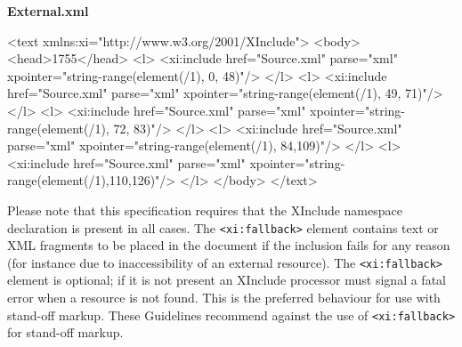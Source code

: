 \par\egroup 
 \mbox{}\newline 
  \textbf{External.xml} \par\hfill\bgroup\exampleFont\vskip 10pt\begin{shaded}
\obeyspaces <text xmlns:xi="http://www.w3.org/2001/XInclude">\newline
 <body>\newline
  <head>1755</head>\newline
   <l>\newline
    <xi:include href="Source.xml" parse="xml"\newline
 xpointer="string-range(element(/1),  0, 48)"/>\newline
   </l>\newline
   <l>\newline
    <xi:include href="Source.xml" parse="xml"\newline
 xpointer="string-range(element(/1), 49, 71)"/>\newline
   </l>\newline
   <l>\newline
    <xi:include href="Source.xml" parse="xml"\newline
 xpointer="string-range(element(/1), 72, 83)"/>\newline
   </l>\newline
   <l>\newline
    <xi:include href="Source.xml" parse="xml"\newline
 xpointer="string-range(element(/1), 84,109)"/>\newline
   </l>\newline
   <l>\newline
    <xi:include href="Source.xml" parse="xml"\newline
 xpointer="string-range(element(/1),110,126)"/>\newline
   </l>\newline
 </body>\newline
</text>\end{shaded}
\par\egroup 
\par
Please note that this specification requires that the XInclude namespace declaration is present in all cases. The \texttt{<xi:fallback>} element contains text or XML fragments to be placed in the document if the inclusion fails for any reason (for instance due to inaccessibility of an external resource). The \texttt{<xi:fallback>} element is optional; if it is not present an XInclude processor must signal a fatal error when a resource is not found. This is the preferred behaviour for use with stand-off markup. These Guidelines recommend against the use of \texttt{<xi:fallback>} for stand-off markup.
